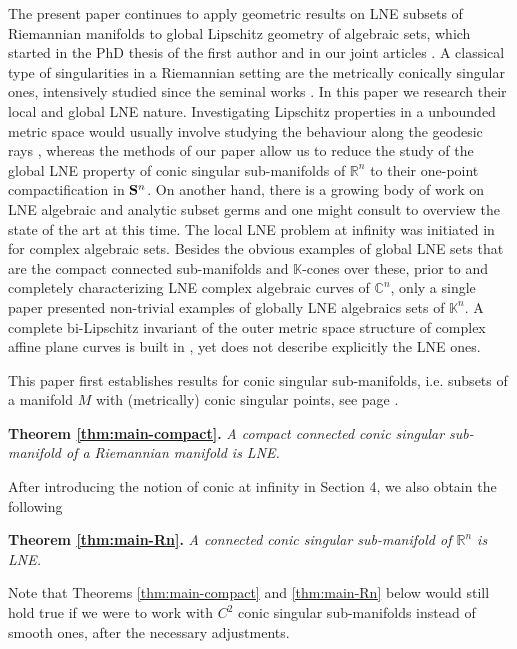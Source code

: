 \documentclass[11pt]{amsart}
\newcommand{\field}[1]{\mathbb{#1}}
\newcommand{\C}{\field{C}}
\newcommand{\K}{\field{K}}
\newcommand{\R}{\field{R}}
\newcommand{\bS}{{\bf S}}
\newcommand{\Cn}{{\C^n}}
\newcommand{\Kn}{{\K^n}}
\newcommand{\Rn}{{\R^n}}
\numberwithin{equation}{section}
\numberwithin{equation}{section}
\begin{document}
The present paper continues to apply geometric results on LNE 
subsets of Riemannian manifolds to global Lipschitz geometry of algebraic 
sets, which started in the PhD thesis of the first author \cite{Cos} and in 
our joint articles \cite{CoGrMi1,CoGrMi2}. A classical type of singularities 
in a Riemannian setting are the metrically conically singular ones, 
intensively studied since the seminal works \cite{Che1,Che2,ChTa1,ChTa2}. In 
this paper we research their local and global LNE nature. 
Investigating Lipschitz properties in a unbounded metric space would usually 
involve studying the behaviour along the geodesic rays
\cite{Gro2,Gro1}, whereas the methods of our paper \cite{CoGrMi2} allow us to reduce 
the study of the global LNE property of conic singular sub-manifolds of $\Rn$ to their 
 one-point compactification in $\bS^n$.
On another hand, there is a growing body of work on LNE algebraic and analytic subset germs 
and one might consult \cite{FaPi,Pic,MeSa} to overview the state of the art 
at this time. The local LNE problem at infinity 
was initiated in \cite{FeSa} for complex algebraic sets. 
Besides the obvious examples of global LNE sets that are the 
compact connected sub-manifolds and $\K$-cones over these, prior to 
\cite{Cos} and \cite{CoGrMi1} completely characterizing LNE complex algebraic curves of $\Cn$, 
only a single paper  \cite{KePeRu} presented 
non-trivial examples of globally LNE algebraics sets of $\Kn$. A complete bi-Lipschitz invariant of the outer metric space structure of complex affine plane curves is built in \cite{Tar}, yet does not describe explicitly the LNE ones. 



\medskip
This paper first establishes results for conic singular sub-manifolds, i.e. 
subsets of a manifold $M$ with (metrically) conic singular points, see page
\pageref{def:conic-point}. 
  
\medskip\noindent
{\bf Theorem \ref{thm:main-compact}.}  \em
A compact connected conic singular sub-manifold of a Riemannian manifold is LNE.
\em
 
\medskip
After introducing the notion of conic at infinity in Section 4, 
we also obtain the following

\medskip\noindent
{\bf Theorem \ref{thm:main-Rn}.}
\em A connected conic singular sub-manifold of $\Rn$ is LNE. \em

\medskip
Note that Theorems \ref{thm:main-compact} and 
\ref{thm:main-Rn} below would still hold true 
if we were to work with $C^2$ conic singular sub-manifolds instead of smooth 
ones,  after the necessary adjustments.
\end{document}

